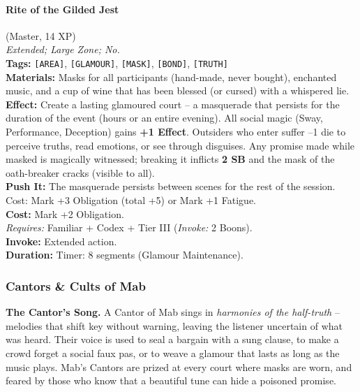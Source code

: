 \paragraph{Rite of the Gilded Jest} (Master, 14 XP) \hfill \\
\emph{Extended; Large Zone; No.} \\
\textbf{Tags:} \texttt{[AREA]}, \texttt{[GLAMOUR]}, \texttt{[MASK]}, \texttt{[BOND]}, \texttt{[TRUTH]} \\
\textbf{Materials:} Masks for all participants (hand-made, never bought), enchanted music, and a cup of wine that has been blessed (or cursed) with a whispered lie. \\
\textbf{Effect:} Create a lasting glamoured court -- a masquerade that persists for the duration of the event (hours or an entire evening). All social magic (Sway, Performance, Deception) gains \textbf{+1 Effect}. Outsiders who enter suffer --1 die to perceive truths, read emotions, or see through disguises. Any promise made while masked is magically witnessed; breaking it inflicts \textbf{2 SB} and the mask of the oath-breaker cracks (visible to all). \\
\textbf{Push It:} The masquerade persists between scenes for the rest of the session. Cost: Mark +3 Obligation (total +5) or Mark +1 Fatigue. \\
\textbf{Cost:} Mark +2 Obligation. \\
\textit{Requires:} Familiar + Codex + Tier III (\textit{Invoke:} 2 Boons). \\
\textbf{Invoke:} Extended action. \\
\textbf{Duration:} Timer: 8 segments (Glamour Maintenance).

\subsubsection*{Cantors \& Cults of Mab}

\textbf{The Cantor's Song.} A Cantor of Mab sings in \textit{harmonies of the half-truth} -- melodies that shift key without warning, leaving the listener uncertain of what was heard. Their voice is used to seal a bargain with a sung clause, to make a crowd forget a social faux pas, or to weave a glamour that lasts as long as the music plays. Mab's Cantors are prized at every court where masks are worn, and feared by those who know that a beautiful tune can hide a poisoned promise.

